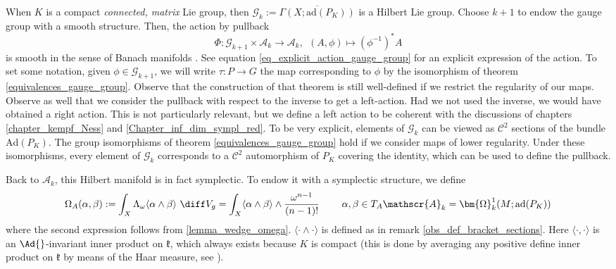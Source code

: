 When \(K\) is a compact \textit{connected, matrix} Lie group, then \(\mathscr{G}_k:=\overline{\Gamma(X; \mathrm{ad}(P_K))}\) is a Hilbert Lie group. Choose \(k+1\) to endow the gauge group with a smooth structure. Then, the action by pullback 
\begin{equation} \label{eq_def_action_Phi}
    \Phi: \mathscr{G}_{k+1} \times \mathscr{A}_k \longrightarrow  \mathscr{A}_k, \ \  (A, \phi) \mapsto (\phi^{-1})^*A 
\end{equation}
is smooth in the sense of Banach manifolds \parencite[Prop. 3.12]{mitter1981bundle}. See equation \eqref{eq_explicit_action_gauge_group} for an explicit expression of the action. To set some notation, given \(\phi \in \mathscr{G}_{k+1}\), we will write \(\tau\colon P \to G\) the map corresponding to \(\phi\) by the isomorphism of theorem \ref{equivalences_gauge_group}. Observe that the construction of that theorem is still well-defined if we restrict the regularity of our maps. Observe as well that we consider the pullback with respect to the inverse to get a left-action. Had we not used the inverse, we would have obtained a right action. This is not particularly relevant, but we define a left action to be coherent with the discussions of chapters \ref{chapter_kempf_Ness} and \ref{Chapter_inf_dim_sympl_red}. To be very explicit, elements of \(\mathscr{G}_k\) can be viewed as \(\mathscr{C}^{2}\) sections of the bundle \(\mathrm{Ad}(P_K)\). The group isomorphisms of theorem \ref{equivalences_gauge_group} hold if we consider maps of lower regularity. Under these isomorphisms, every element of \(\mathscr{G}_k\) corresponds to a \(\mathscr{C}^{2}\) automorphism of \(P_K\) covering the identity, which can be used to define the pullback. 

Back to \(\mathscr{A}_k\), this Hilbert manifold is in fact symplectic. To endow it with a symplectic structure, we define 
\begin{equation} \label{eq_def_sympl_form_connections}
\Omega_A(\alpha, \beta):=\int_X \Lambda_\omega\langle \alpha \wedge \beta \rangle \ \diff V_g = \int_X \langle \alpha \wedge \beta \rangle \wedge \frac{\omega^{n-1}}{(n-1)!} \hspace{0.8 cm} \alpha, \beta \in T_A \mathscr{A}_k = \bm{\Omega}^1_k(M; \mathrm{ad}(P_K))
\end{equation}
where the second expression follows from \ref{lemma_wedge_omega}. \(\langle \cdot \wedge \cdot \rangle\) is defined as in remark \ref{obs_def_bracket_sections}. Here \(\langle \cdot, \cdot \rangle\) is an \(\Ad{}\)-invariant inner product on \(\mathfrak{k}\), which always exists because \(K\) is compact (this is done by averaging any positive define inner product on \(\mathfrak{k}\) by means of the Haar measure, see \parencite[Lemma 10.4.14]{hilgert2011structure}).

